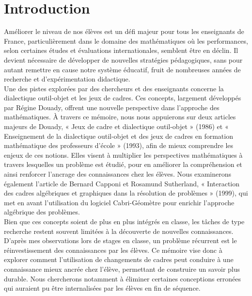 \def\theme{\large Interactions des Cadres Algébriques et Géometrique dans la remédiation de l'apprentissage des puissances}
\def\date{04/11/2023}

\section*{Introduction}

Améliorer le niveau de nos élèves est un défi majeur pour tous les enseignants de France,
particulièrement dans le domaine des mathématiques où les performances,
selon certaines études et évaluations internationales,
semblent être en déclin.
Il devient nécessaire de développer de nouvelles stratégies pédagogiques,
sans pour autant remettre en cause notre système éducatif,
fruit de nombreuses années de recherche et d'expérimentation didactique.\\

Une des pistes explorées par des chercheurs et des enseignants concerne la dialectique outil-objet et les jeux de cadres.
Ces concepts,
largement développés par Régine Douady,
offrent une nouvelle perspective dans l'approche des mathématiques.
À travers ce mémoire, nous nous appuierons sur deux articles majeurs de Douady,
« Jeux de cadre et dialectique outil-objet » (1986) et « Enseignement de la dialectique outil-objet et des jeux de cadres en formation mathématique des professeurs d'école » (1993),
afin de mieux comprendre les enjeux de ces notions.
Elles visent à multiplier les perspectives mathématiques à travers lesquelles un problème est étudié,
pour en améliorer la compréhension et ainsi renforcer l'ancrage des connaissances chez les élèves.
Nous examinerons également l'article de Bernard Capponi et Rosamund Sutherland,
« Interaction des cadres algébriques et graphiques dans la résolution de problèmes » (1999),
qui met en avant l'utilisation du logiciel Cabri-Géomètre pour enrichir l'approche algébrique des problèmes.\\

Bien que ces concepts soient de plus en plus intégrés en classe,
les tâches de type recherche restent souvent limitées à la découverte de nouvelles connaissances.
D'après mes observations lors de stages en classe,
un problème récurrent est le réinvestissement des connaissances par les élèves.
Ce mémoire vise donc à explorer comment l'utilisation de changements de cadres peut conduire à une connaissance mieux ancrée chez l'élève,
permettant de construire un savoir plus durable.
Nous chercherons notamment à éliminer certaines conceptions erronées qui auraient pu être internalisées par les élèves en fin de séquence.\\

